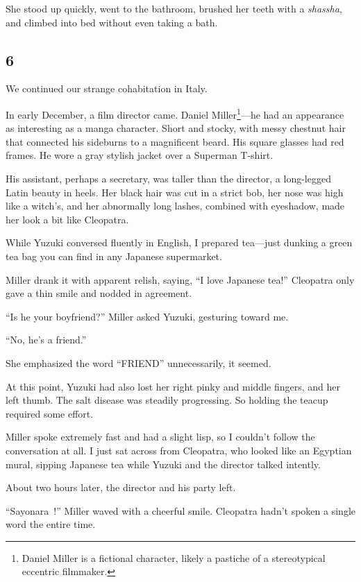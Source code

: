 \documentclass[
    a4paper,
    12pt,
    twoside,
    openany,
    UTF8,
    fontset=windows
]{ctexbook}
\begin{document}
She stood up quickly, went to the bathroom, brushed her teeth with a \textit{shassha}, and climbed into bed without even taking a bath.


\subsection*{6}

We continued our strange cohabitation in Italy.

In early December, a film director came. Daniel Miller\footnote{Daniel Miller is a fictional character, likely a pastiche of a stereotypical eccentric filmmaker.}---he had an appearance as interesting as a manga character. Short and stocky, with messy chestnut hair that connected his sideburns to a magnificent beard. His square glasses had red frames. He wore a gray stylish jacket over a Superman T-shirt.

His assistant, perhaps a secretary, was taller than the director, a long-legged Latin beauty in heels. Her black hair was cut in a strict bob, her nose was high like a witch's, and her abnormally long lashes, combined with eyeshadow, made her look a bit like Cleopatra.

While Yuzuki conversed fluently in English, I prepared tea---just dunking a green tea bag you can find in any Japanese supermarket.

Miller drank it with apparent relish, saying, ``I love Japanese tea!'' Cleopatra only gave a thin smile and nodded in agreement.

``Is he your boyfriend?'' Miller asked Yuzuki, gesturing toward me.

``No, he's a friend.''

She emphasized the word ``FRIEND'' unnecessarily, it seemed.

At this point, Yuzuki had also lost her right pinky and middle fingers, and her left thumb. The salt disease was steadily progressing. So holding the teacup required some effort.

Miller spoke extremely fast and had a slight lisp, so I couldn't follow the conversation at all. I just sat across from Cleopatra, who looked like an Egyptian mural, sipping Japanese tea while Yuzuki and the director talked intently.

About two hours later, the director and his party left.

``Sayonara~!'' Miller waved with a cheerful smile. Cleopatra hadn't spoken a single word the entire time.
\end{document}
